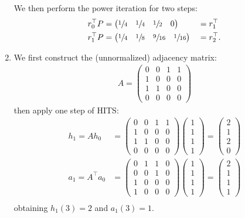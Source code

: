 \begin{enumerate}
  We then perform the power iteration for two steps:
  \begin{alignat*}{2}
    r_0^\top P &=
      \begin{pmatrix}
        \sfrac{1}{4}&\sfrac{1}{4}&\sfrac{1}{2}&0
      \end{pmatrix} &&= r_1^\top \\
    r_1^\top P &=
      \begin{pmatrix}
        \sfrac{1}{4}&\sfrac{1}{8}&\sfrac{9}{16}&\sfrac{1}{16}
      \end{pmatrix} &&= r_2^\top.
  \end{alignat*}

  \item We first construct the (unnormalized) adjacency matrix:
  \begin{align*}
    A =
    \begin{pmatrix}
      0&0&1&1 \\
      1&0&0&0 \\
      1&1&0&0 \\
      0&0&0&0
    \end{pmatrix}
  \end{align*}
  then apply one step of HITS:
  \begin{align*}
    h_1 = Ah_0 &=
    \begin{pmatrix}
      0&0&1&1 \\
      1&0&0&0 \\
      1&1&0&0 \\
      0&0&0&0
    \end{pmatrix}
    \begin{pmatrix}
      1\\1\\1\\1
    \end{pmatrix}
    =
    \begin{pmatrix}
      2\\1\\2\\0
    \end{pmatrix}\\
    a_1 = A^\top a_0 &=
    \begin{pmatrix}
      0&1&1&0 \\
      0&0&1&0 \\
      1&0&0&0 \\
      1&0&0&0
    \end{pmatrix}
    \begin{pmatrix}
      1\\1\\1\\1
    \end{pmatrix}
    =
    \begin{pmatrix}
      2\\1\\1\\1
    \end{pmatrix}\\
  \end{align*}
  obtaining $h_1(3) = 2$ and $a_1(3) = 1$.


\end{enumerate}
